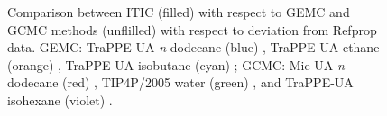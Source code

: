 \documentclass[5p,times]{elsarticle}
\begin{document}
\begin{figure}
\caption{Comparison between ITIC (filled) with respect to GEMC and GCMC methods (unflilled) with respect to deviation from Refprop data. 
GEMC: TraPPE-UA \textit{n}-dodecane  (blue) \cite{Martin1998}, TraPPE-UA ethane (orange) \cite{Martin1998}, TraPPE-UA isobutane (cyan) \cite{Wick2000};
GCMC: Mie-UA \textit{n}-dodecane (red) \cite{Potoff2009}, TIP4P/2005 water (green) \cite{Shen2008}, and TraPPE-UA isohexane (violet) \cite{Mick2017}.}
\label{fig:EXAMPLE-SIM/Deviation-Psat-rhoL-rhoV}
\end{figure}


\end{document}
